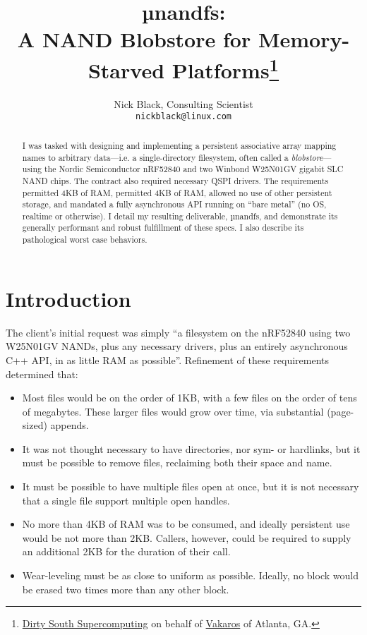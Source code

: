 \documentclass[letterpaper,10pt]{article}
\title{µnandfs:\\
A NAND Blobstore for Memory-Starved Platforms\thanks{
 \href{https://www.dsscaw.com/}{Dirty South Supercomputing} on behalf
 of \href{https://www.vakaros.com/}{Vakaros} of Atlanta, GA.
}\\
}
\author{Nick Black, Consulting Scientist\\
\texttt{nickblack@linux.com}
}
\newenvironment{denseitemize}{
  \begin{itemize}
      \setlength{\itemsep}{0pt}
}{
  \end{itemize}
}
\begin{document}
\maketitle
\thispagestyle{fancy}
\date{}
\begin{abstract}
I was tasked with designing and implementing a persistent associative array
mapping names to arbitrary data---i.e. a single-directory filesystem, often
called a \textit{blobstore}---using the Nordic Semiconductor nRF52840 and two
Winbond W25N01GV gigabit SLC NAND chips. The contract also required necessary
QSPI drivers. The requirements permitted 4KB of RAM, permitted 4KB of RAM,
allowed no use of other persistent storage, and mandated a fully asynchronous
API running on ``bare metal'' (no OS, realtime or otherwise). I detail my
resulting deliverable, µnandfs, and demonstrate its generally performant
and robust fulfillment of these specs. I also describe its pathological worst
case behaviors.
\end{abstract}
\section{Introduction}
The client's initial request was simply ``a filesystem on the nRF52840 using
two W25N01GV NANDs, plus any necessary drivers, plus an entirely asynchronous
C++ API, in as little RAM as possible''. Refinement of these requirements
determined that:
\begin{denseitemize}
\item Most files would be on the order of 1KB, with a few files
       on the order of tens of megabytes. These larger files would grow
       over time, via substantial (page-sized) appends.
\item It was not thought necessary to have directories, nor sym- or hardlinks,
       but it must be possible to remove files, reclaiming both their space and
       name.
\item It must be possible to have multiple files open at once, but it is not
       necessary that a single file support multiple open handles.
\item No more than 4KB of RAM was to be consumed, and ideally persistent use
       would be not more than 2KB. Callers, however, could be required to supply
       an additional 2KB for the duration of their call.
\item Wear-leveling must be as close to uniform as possible. Ideally, no block
       would be erased two times more than any other block.
\end{denseitemize}
\end{document}
